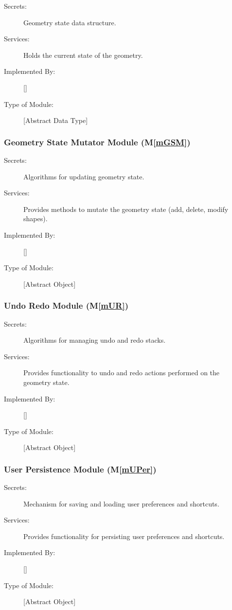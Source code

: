\documentclass[12pt, titlepage]{article}
\newcommand{\mref}[1]{M\ref{#1}}
\begin{document}
\begin{description}
\item[Secrets:]Geometry state data structure.
\item[Services:]Holds the current state of the geometry.
\item[Implemented By:] [\progname{}]
\item[Type of Module:] [Abstract Data Type]
\end{description}

\subsubsection{Geometry State Mutator Module (\mref{mGSM})}

\begin{description}
\item[Secrets:]Algorithms for updating geometry state.
\item[Services:]Provides methods to mutate the geometry state (add, delete, modify shapes).
\item[Implemented By:] [\progname{}]
\item[Type of Module:] [Abstract Object]
\end{description}

\subsubsection{Undo Redo Module (\mref{mUR})}

\begin{description}
\item[Secrets:]Algorithms for managing undo and redo stacks.
\item[Services:]Provides functionality to undo and redo actions performed on the geometry state.
\item[Implemented By:] [\progname{}]
\item[Type of Module:] [Abstract Object]
\end{description}


\subsubsection{User Persistence Module (\mref{mUPer})}

\begin{description}
\item[Secrets:]Mechanism for saving and loading user preferences and shortcuts.
\item[Services:]Provides functionality for persisting user preferences and shortcuts.
\item[Implemented By:] [\progname{}]
\item[Type of Module:] [Abstract Object]
\end{description}
\end{document}
